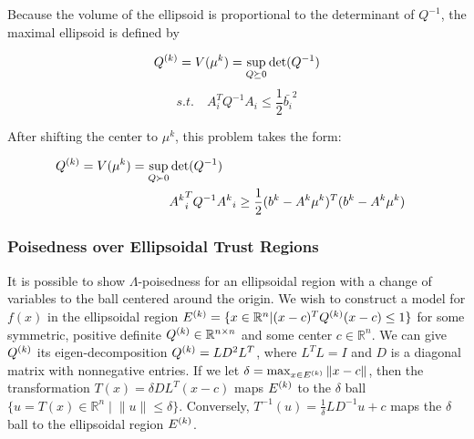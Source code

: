 Because the volume of the ellipsoid is proportional to the determinant of $Q^{-1}$, the maximal ellipsoid is defined by

\[
{Q^{(k)}} = V(\mu^k) = \sup_{Q \succeq 0} \det(Q^{-1})
\]
\[
s.t. \quad A_i^T Q^{-1} A_i \le \frac 1 2 \bar{b_i}^2
\]



After shifting the center to $\mu^{k}$, this problem takes the form:

\begin{center}
\begin{align}
\label{ellipse_1}
{Q^{(k)}} = V(\mu^k) = \sup_{Q \succ 0} & \det(Q^{-1}) & \\
  & {A^k}_i^T Q^{-1} {A^k}_i \ge \frac 1 2 (b^k - A^k\mu^{k})^T(b^k - A^k \mu^{k}) & \nonumber
\end{align}
\end{center}



%

\subsubsection{Poisedness over Ellipsoidal Trust Regions}
\label{ellipsoidal_lambda}

It is possible to show $\Lambda$-poisedness for an ellipsoidal region with a change of variables to the ball centered around the origin.
We wish to construct a model for $f(x)$ in the ellipsoidal region
${E^{(k)}} = \{x \in \mathbb R^n | (x - c)^T{Q^{(k)}}(x - c) \le 1\}$ for some symmetric, positive definite
${Q^{(k)}} \in \mathbb R^{n\times n}$ and some center $c \in \mathbb R^n$.
We can give ${Q^{(k)}}$ its eigen-decomposition ${Q^{(k)}} = L D^2 L^T$, where $L^TL = I$ and $D$ is a diagonal matrix with nonnegative entries.
If we let $\delta = \max_{x\in {E^{(k)}}}\|x-c\|$, then the transformation $T(x) = \delta DL^T(x - c)$ maps $ {E^{(k)}} $ to the $\delta$ ball $\{u = T(x) \in \mathbb R^n \; | \; \|u\| \le \delta\}$.
Conversely, $ T^{-1}(u) = \frac 1 {\delta} LD^{-1}u + c$ maps the $\delta$ ball to the ellipsoidal region $ {E^{(k)}} $.

